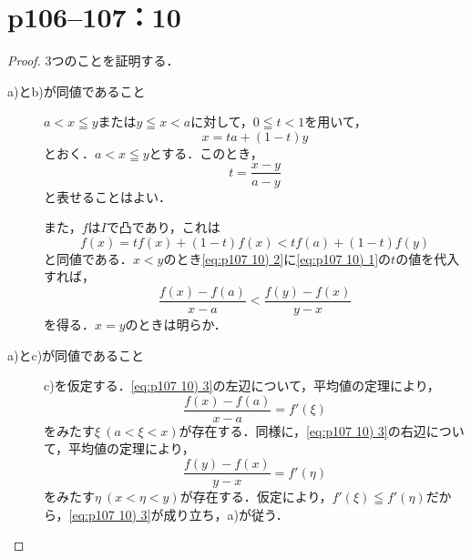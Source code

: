 \documentclass[a4paper,10pt,fleqn]{ltjsarticle}
\begin{document}
\newpage

\section*{p106--107：10}



\begin{tleftbar}
    \begin{proof}
        3つのことを証明する．
        \begin{description}
            \item[a)とb)が同値であること] \mbox{} \par
                  $a < x \leqq y$または$y \leqq x <a$に対して，$0 \leqq t < 1$を用いて，
                  \[
                      x=ta+(1-t)y
                  \]
                  とおく．$a < x \leqq y$とする．このとき，
                  \begin{equation}
                      \label{eq:p107 10) 1}
                      t = \frac{x-y}{a-y}
                  \end{equation}
                  と表せることはよい．

                  また，$f$は$I$で凸であり，これは
                  \begin{equation}
                      \label{eq:p107 10) 2}
                      f(x)=tf(x)+(1-t)f(x) < tf(a)+(1-t)f(y)
                  \end{equation}
                  と同値である．$x<y$のとき\eqref{eq:p107 10) 2}に\eqref{eq:p107 10) 1}の$t$の値を代入すれば，
                  \begin{equation}
                      \label{eq:p107 10) 3}
                      \frac{f(x)-f(a)}{x-a} < \frac{f(y)-f(x)}{y-x}
                  \end{equation}
                  を得る．$x=y$のときは明らか．
            \item [a)とc)が同値であること] \mbox{} \par
                  c)を仮定する．\eqref{eq:p107 10) 3}の左辺について，平均値の定理により，
                  \[
                      \frac{f(x)-f(a)}{x-a}=f'(\xi)
                  \]
                  をみたす$\xi ~(a<\xi <x)$が存在する．同様に，\eqref{eq:p107 10) 3}の右辺について，平均値の定理により，
                  \[
                      \frac{f(y)-f(x)}{y-x}=f'(\eta)
                  \]
                  をみたす$\eta~ (x<\eta < y)$が存在する．仮定により，$f'(\xi)\leqq f'(\eta)$だから，\eqref{eq:p107 10) 3}が成り立ち，a)が従う．


\end{description}
\end{proof}
\end{tleftbar}
\end{document}
